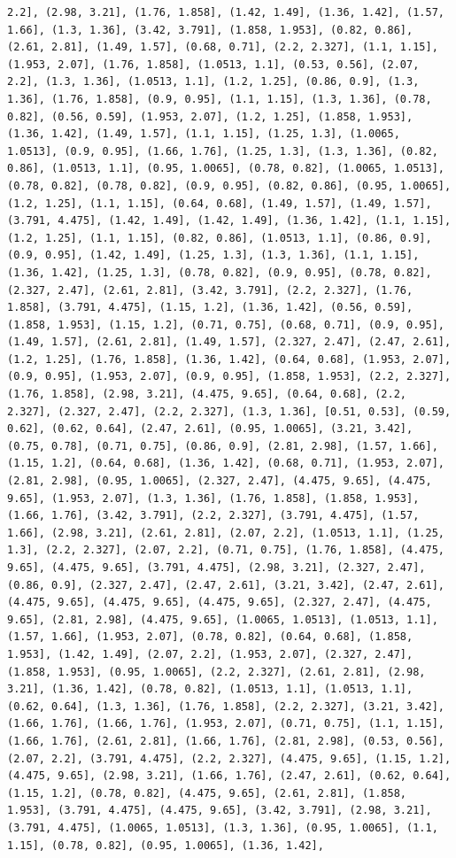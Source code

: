 \documentclass[12pt,fleqn]{article}\usepackage{../common}
\begin{document}
\begin{verbatim}
2.2], (2.98, 3.21], (1.76, 1.858], (1.42, 1.49], (1.36, 1.42], (1.57, 1.66], (1.3, 1.36], (3.42, 3.791], (1.858, 1.953], (0.82, 0.86], (2.61, 2.81], (1.49, 1.57], (0.68, 0.71], (2.2, 2.327], (1.1, 1.15], (1.953, 2.07], (1.76, 1.858], (1.0513, 1.1], (0.53, 0.56], (2.07, 2.2], (1.3, 1.36], (1.0513, 1.1], (1.2, 1.25], (0.86, 0.9], (1.3, 1.36], (1.76, 1.858], (0.9, 0.95], (1.1, 1.15], (1.3, 1.36], (0.78, 0.82], (0.56, 0.59], (1.953, 2.07], (1.2, 1.25], (1.858, 1.953], (1.36, 1.42], (1.49, 1.57], (1.1, 1.15], (1.25, 1.3], (1.0065, 1.0513], (0.9, 0.95], (1.66, 1.76], (1.25, 1.3], (1.3, 1.36], (0.82, 0.86], (1.0513, 1.1], (0.95, 1.0065], (0.78, 0.82], (1.0065, 1.0513], (0.78, 0.82], (0.78, 0.82], (0.9, 0.95], (0.82, 0.86], (0.95, 1.0065], (1.2, 1.25], (1.1, 1.15], (0.64, 0.68], (1.49, 1.57], (1.49, 1.57], (3.791, 4.475], (1.42, 1.49], (1.42, 1.49], (1.36, 1.42], (1.1, 1.15], (1.2, 1.25], (1.1, 1.15], (0.82, 0.86], (1.0513, 1.1], (0.86, 0.9], (0.9, 0.95], (1.42, 1.49], (1.25, 1.3], (1.3, 1.36], (1.1, 1.15], (1.36, 1.42], (1.25, 1.3], (0.78, 0.82], (0.9, 0.95], (0.78, 0.82], (2.327, 2.47], (2.61, 2.81], (3.42, 3.791], (2.2, 2.327], (1.76, 1.858], (3.791, 4.475], (1.15, 1.2], (1.36, 1.42], (0.56, 0.59], (1.858, 1.953], (1.15, 1.2], (0.71, 0.75], (0.68, 0.71], (0.9, 0.95], (1.49, 1.57], (2.61, 2.81], (1.49, 1.57], (2.327, 2.47], (2.47, 2.61], (1.2, 1.25], (1.76, 1.858], (1.36, 1.42], (0.64, 0.68], (1.953, 2.07], (0.9, 0.95], (1.953, 2.07], (0.9, 0.95], (1.858, 1.953], (2.2, 2.327], (1.76, 1.858], (2.98, 3.21], (4.475, 9.65], (0.64, 0.68], (2.2, 2.327], (2.327, 2.47], (2.2, 2.327], (1.3, 1.36], [0.51, 0.53], (0.59, 0.62], (0.62, 0.64], (2.47, 2.61], (0.95, 1.0065], (3.21, 3.42], (0.75, 0.78], (0.71, 0.75], (0.86, 0.9], (2.81, 2.98], (1.57, 1.66], (1.15, 1.2], (0.64, 0.68], (1.36, 1.42], (0.68, 0.71], (1.953, 2.07], (2.81, 2.98], (0.95, 1.0065], (2.327, 2.47], (4.475, 9.65], (4.475, 9.65], (1.953, 2.07], (1.3, 1.36], (1.76, 1.858], (1.858, 1.953], (1.66, 1.76], (3.42, 3.791], (2.2, 2.327], (3.791, 4.475], (1.57, 1.66], (2.98, 3.21], (2.61, 2.81], (2.07, 2.2], (1.0513, 1.1], (1.25, 1.3], (2.2, 2.327], (2.07, 2.2], (0.71, 0.75], (1.76, 1.858], (4.475, 9.65], (4.475, 9.65], (3.791, 4.475], (2.98, 3.21], (2.327, 2.47], (0.86, 0.9], (2.327, 2.47], (2.47, 2.61], (3.21, 3.42], (2.47, 2.61], (4.475, 9.65], (4.475, 9.65], (4.475, 9.65], (2.327, 2.47], (4.475, 9.65], (2.81, 2.98], (4.475, 9.65], (1.0065, 1.0513], (1.0513, 1.1], (1.57, 1.66], (1.953, 2.07], (0.78, 0.82], (0.64, 0.68], (1.858, 1.953], (1.42, 1.49], (2.07, 2.2], (1.953, 2.07], (2.327, 2.47], (1.858, 1.953], (0.95, 1.0065], (2.2, 2.327], (2.61, 2.81], (2.98, 3.21], (1.36, 1.42], (0.78, 0.82], (1.0513, 1.1], (1.0513, 1.1], (0.62, 0.64], (1.3, 1.36], (1.76, 1.858], (2.2, 2.327], (3.21, 3.42], (1.66, 1.76], (1.66, 1.76], (1.953, 2.07], (0.71, 0.75], (1.1, 1.15], (1.66, 1.76], (2.61, 2.81], (1.66, 1.76], (2.81, 2.98], (0.53, 0.56], (2.07, 2.2], (3.791, 4.475], (2.2, 2.327], (4.475, 9.65], (1.15, 1.2], (4.475, 9.65], (2.98, 3.21], (1.66, 1.76], (2.47, 2.61], (0.62, 0.64], (1.15, 1.2], (0.78, 0.82], (4.475, 9.65], (2.61, 2.81], (1.858, 1.953], (3.791, 4.475], (4.475, 9.65], (3.42, 3.791], (2.98, 3.21], (3.791, 4.475], (1.0065, 1.0513], (1.3, 1.36], (0.95, 1.0065], (1.1, 1.15], (0.78, 0.82], (0.95, 1.0065], (1.36, 1.42], 
\end{verbatim}
\end{document}
